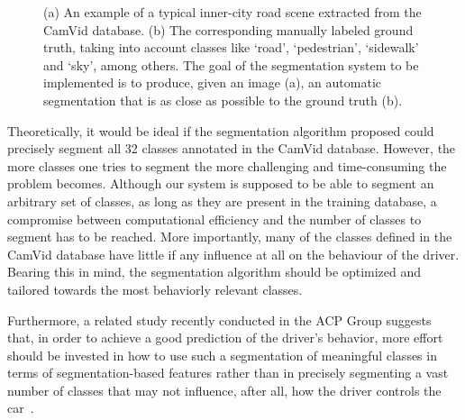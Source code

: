 \begin{figure}
\caption[Example of ideal segmentation]{(a) An example of a typical inner-city road scene extracted from the CamVid database. (b) The corresponding manually labeled ground truth, taking into account classes like `road', `pedestrian', `sidewalk' and `sky', among others. The goal of the segmentation system to be implemented is to produce, given an image (a), an automatic segmentation that is as close as possible to the ground truth (b).}
\label{fig:ideal_segmentation}
\end{figure}

Theoretically, it would be ideal if the segmentation algorithm proposed could precisely segment all 32 classes annotated in the CamVid database. However, the more classes one tries to segment the more challenging and time-consuming the problem becomes. Although our system is supposed to be able to segment an arbitrary set of classes, as long as they are present in the training database, a compromise between computational efficiency and the number of classes to segment has to be reached. More importantly, many of the classes defined in the CamVid database have little if any influence at all on the behaviour of the driver. Bearing this in mind, the segmentation algorithm should be optimized and tailored towards the most behaviorly relevant classes.

Furthermore, a related study recently conducted in the ACP Group suggests that, in order to achieve a good prediction of the driver's behavior, more effort should be invested in how to use such a segmentation of meaningful classes in terms of segmentation-based features rather than in precisely segmenting a vast number of classes that may not influence, after all, how the driver controls the car~\cite{heracles:behavior}.

















